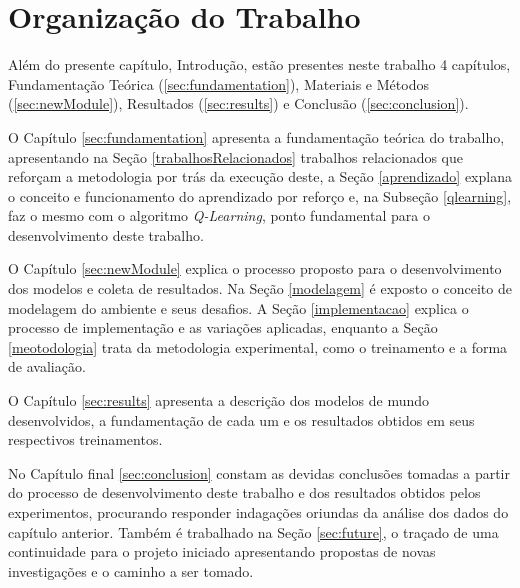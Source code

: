 \section{Organização do Trabalho}

Além do presente capítulo, Introdução, estão presentes neste trabalho 4 capítulos, Fundamentação
Teórica (\ref{sec:fundamentation}), Materiais e Métodos (\ref{sec:newModule}), Resultados
(\ref{sec:results}) e Conclusão (\ref{sec:conclusion}).

O Capítulo \ref{sec:fundamentation} apresenta a fundamentação teórica do trabalho, apresentando na Seção
\ref{trabalhosRelacionados} trabalhos relacionados que reforçam a metodologia por trás da execução
deste, a Seção \ref{aprendizado} explana o conceito e funcionamento do aprendizado por reforço e, na
Subseção \ref{qlearning}, faz o mesmo com o algoritmo \textit{Q-Learning}, ponto fundamental para o
desenvolvimento deste trabalho.

O Capítulo \ref{sec:newModule} explica o processo proposto para o desenvolvimento dos modelos e
coleta de resultados. Na Seção \ref{modelagem} é exposto o conceito de modelagem do ambiente e seus
desafios. A Seção \ref{implementacao} explica o processo de implementação e as
variações aplicadas, enquanto a Seção \ref{meotodologia} trata da metodologia
experimental, como o treinamento e a forma de avaliação.

O Capítulo \ref{sec:results} apresenta a descrição dos modelos de mundo desenvolvidos, a fundamentação de
cada um e os resultados obtidos em seus respectivos treinamentos.

No Capítulo final \ref{sec:conclusion} constam as devidas conclusões tomadas a partir do processo de
desenvolvimento deste trabalho e dos resultados obtidos pelos experimentos, procurando responder
indagações oriundas da análise dos dados do capítulo anterior. Também é
trabalhado na Seção \ref{sec:future}, o traçado de uma continuidade
para o projeto iniciado apresentando propostas de novas investigações e o caminho a ser tomado.